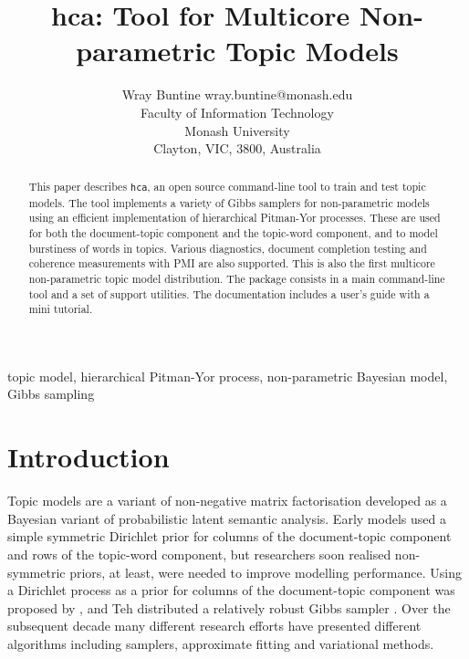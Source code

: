 \documentclass[twoside,11pt]{article}
\begin{document}
\title{hca: Tool for Multicore Non-parametric Topic Models}

\author{\name Wray Buntine \email wray.buntine@monash.edu \\
       \addr Faculty of Information Technology \\
       Monash University\\
       Clayton, VIC, 3800, Australia}


\maketitle

\begin{abstract}%
This paper describes {\tt hca}, an open source command-line tool to
train and test topic models.  The tool implements a variety of Gibbs
samplers for non-parametric models using an efficient implementation
of hierarchical Pitman-Yor processes.  These are used for both the
document-topic component and the topic-word component, and to model
burstiness of words in topics.  Various diagnostics, document
completion testing and coherence measurements with PMI are also
supported.  This is also the first multicore non-parametric topic
model distribution.  The package consists in a main command-line tool
and a set of support utilities. The documentation includes a user's
guide with a mini tutorial.
\end{abstract}

\begin{keywords}
  topic model, hierarchical Pitman-Yor process, non-parametric Bayesian model,
  Gibbs sampling
\end{keywords}

\section{Introduction}
Topic models are a variant of non-negative matrix factorisation developed
as a Bayesian variant of probabilistic latent semantic analysis.  Early models
used a simple symmetric Dirichlet prior for columns of the
document-topic component and rows of the topic-word component, but
researchers soon realised non-symmetric priors, at least, were needed
to improve modelling performance.  Using a Dirichlet process as a prior
for columns of the document-topic component was proposed by
\cite{TehJorBea2006}, and Teh distributed a relatively robust Gibbs
sampler \cite{TehNBMM21}.  Over the subsequent decade many different
research efforts have presented different algorithms including
samplers, approximate fitting and variational methods.
\end{document}

